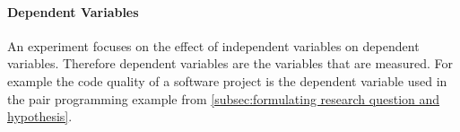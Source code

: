 
\paragraph{Dependent Variables}

An experiment focuses on the effect of independent variables on dependent variables. Therefore dependent variables are the variables that are measured. For example the code quality of a software project is the dependent variable used in the pair programming example from \ref{subsec:formulating research question and hypothesis}.
